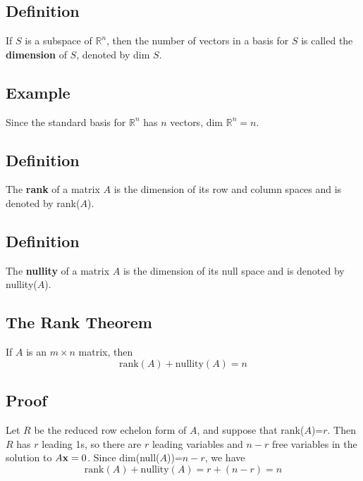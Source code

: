 \subsection*{Definition}
If $S$ is a subspace of $\mathbb{R}^n$, then the number of vectors in a basis for $S$
is called the \textbf{dimension} of $S$, denoted by dim $S$.

\subsection*{Example}
Since the standard basis for $\mathbb{R}^n$ has $n$ vectors, dim $\mathbb{R}^n=n$.

\subsection*{Definition}
The \textbf{rank} of a matrix $A$ is the dimension of its row and column spaces
and is denoted by rank($A$).

\subsection*{Definition}
The \textbf{nullity} of a matrix $A$ is the dimension of its null space and is denoted
by nullity($A$).

\subsection*{The Rank Theorem}
If $A$ is an $m\times n$ matrix, then
\[\text{rank}(A)+\text{nullity}(A)=n\]

\subsection*{Proof}
Let $R$ be the reduced row echelon form of $A$, and suppose that rank($A$)=$r$.
Then $R$ has $r$ leading 1s, so there are $r$ leading variables and $n-r$ free
variables in the solution to $A\mathbf{x}=0$. Since dim(null($A$))=$n-r$, we have
\[\text{rank}(A)+\text{nullity}(A)=r+(n-r)=n\]

